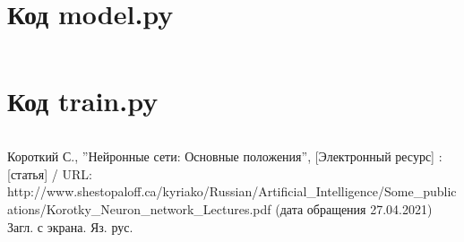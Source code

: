\documentclass[bachelor, och, coursework]{SCWorks}
\begin{document}
    \section{Код model.py}
    \inputminted[fontsize=\footnotesize]{python}{model-ver-2/model.py}

    \section{Код train.py}
    \inputminted[fontsize=\footnotesize]{python}{model-ver-2/train.py}

\begin{thebibliography}{99}
     Короткий С., ''Нейронные сети: Основные положения'', [Электронный ресурс] : [статья] / URL: http://www.shestopaloff.ca/kyriako/Russian/Artificial_Intelligence/Some_publications/Korotky_Neuron_network_Lectures.pdf  (дата обращения 27.04.2021) Загл. с экрана. Яз. рус.
\end{thebibliography}
\end{document}

